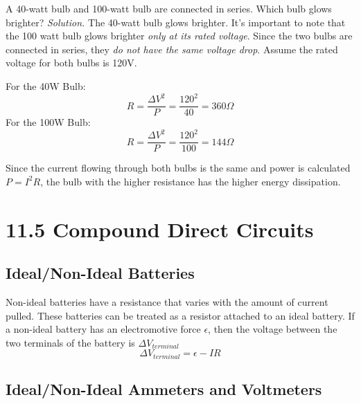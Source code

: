 \documentclass[12pt, titlepage]{article}
\begin{document}
\begin{Problem}
    A 40-watt bulb and 100-watt bulb are connected in series. Which bulb glows brighter?
    \tcblower
    \textit{Solution. } The 40-watt bulb glows brighter. It's important to note that the 100 watt bulb glows brighter \textit{only at its rated voltage}. Since the two bulbs are connected in series, they \textit{do not have the same voltage drop}. Assume the rated voltage for both bulbs is 120V. 
    
    For the 40W Bulb:
    \begin{equation*}
        R = \frac{\Delta V^2}{P} = \frac{120^2}{40} = 360\Omega
    \end{equation*}
    For the 100W Bulb:
    \begin{equation*}
        R = \frac{\Delta V^2}{P} = \frac{120^2}{100} = 144\Omega
    \end{equation*}

    Since the current flowing through both bulbs is the same and power is calculated $P = I^2R$, the bulb with the higher resistance has the higher energy dissipation.
\end{Problem}

\section*{11.5 Compound Direct Circuits}

\subsection*{Ideal/Non-Ideal Batteries}
Non-ideal batteries have a resistance that varies with the amount of current pulled. These batteries can be treated as a resistor attached to an ideal battery. If a non-ideal battery has an electromotive force $\epsilon$, then the voltage between the two terminals of the battery is $\Delta V_{terminal}$
\begin{equation*}
    \Delta V_{terminal} = \epsilon - IR
\end{equation*}

\subsection*{Ideal/Non-Ideal Ammeters and Voltmeters}
\end{document}
